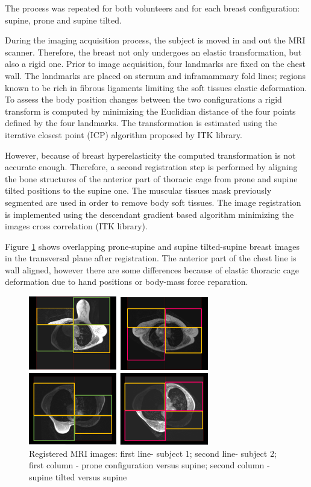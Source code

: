 The process was repeated for both volunteers and for each breast configuration: supine, prone and supine tilted.


During the imaging acquisition process, the subject is moved in and out the MRI scanner. Therefore, the breast not only undergoes an elastic transformation, but also a rigid one. Prior to image acquisition, four landmarks are fixed on the chest wall.  The landmarks are placed on sternum and inframammary fold lines; regions known to be rich in fibrous ligaments limiting the soft tissues elastic deformation.  To assess the body position changes between the two configurations a rigid transform is computed by minimizing the Euclidian distance of the four points defined by the four landmarks. The transformation is estimated using the iterative closest point (ICP) algorithm proposed by ITK library.

However, because of breast hyperelasticity the computed transformation is not accurate enough. Therefore, a second registration step is performed by aligning the bone structures of the anterior part of thoracic cage from prone and supine tilted positions to the supine one. The muscular tissues mask previously segmented are used in order to remove body soft tissues. The image registration is implemented using the descendant gradient based algorithm minimizing the images cross correlation (ITK library).

Figure \ref{fig:patientdataregistered} shows overlapping  prone-supine and supine tilted-supine breast images in the transversal plane after registration. The anterior part of the chest line is wall aligned, however there are some differences because of elastic thoracic cage deformation due to hand positions or body-mass force reparation. 

\begin{figure}[!h]
\centering
\includegraphics[width=0.7\textwidth,keepaspectratio]{figures/patientDataRegistered.png} 
\caption{Registered MRI images: first line- subject 1; second line- subject 2; first column - prone configuration versus supine; second column - supine tilted versus supine }\label{fig:patientdataregistered}
\end{figure}

